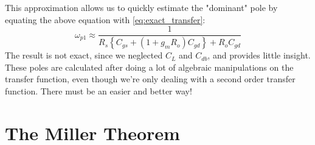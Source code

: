 This approximation allows us to quickly estimate the "dominant" pole by equating the above equation with \ref{eq:exact_transfer}:
    \begin{equation} 
        {\omega _{p1}} \approx \frac{1}{{{R_s}\left\{ {{C_{gs}} + \left( {1 + {g_m}{{R}_{o}}} \right){C_{gd}}} \right\} + {{R}_{o}}{C_{gd}}}}  \label{eq:pole_almost_exact}
    \end{equation}
The result is not exact, since we neglected $C_L$ and $C_{db}$, and provides little insight.  These poles are calculated after doing a lot of algebraic manipulations on the transfer function, even though we're only dealing with a second order transfer function. There must be an easier and better way!
\section{The Miller Theorem}
